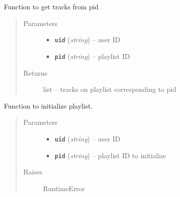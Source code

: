 \documentclass[letterpaper,10pt,english]{sphinxmanual}
\begin{document}
\begin{fulllineitems}
\begin{fulllineitems}
\end{fulllineitems}


\begin{fulllineitems}
\label{index:gitsound.SpotifyUser.get_playlist_tracks}
Function to get tracks from pid
\begin{quote}\begin{description}
\item[{Parameters}] \leavevmode\begin{itemize}
\item {} 
\textbf{\texttt{uid}} (\emph{string}) -- user ID

\item {} 
\textbf{\texttt{pid}} (\emph{string}) -- playlist ID

\end{itemize}

\item[{Returns}] \leavevmode
list -- tracks on playlist corresponding to pid

\end{description}\end{quote}

\end{fulllineitems}


\begin{fulllineitems}
\label{index:gitsound.SpotifyUser.init_git_playlist}
Function to initialize playlist.
\begin{quote}\begin{description}
\item[{Parameters}] \leavevmode\begin{itemize}
\item {} 
\textbf{\texttt{uid}} (\emph{string}) -- user ID

\item {} 
\textbf{\texttt{pid}} (\emph{string}) -- playlist ID to initialize

\end{itemize}

\item[{Raises}] \leavevmode
RuntimeError

\end{description}\end{quote}


\end{fulllineitems}
\end{fulllineitems}
\end{document}
